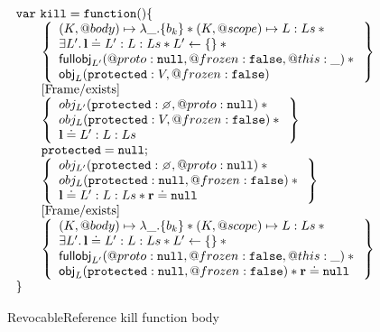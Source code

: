 \documentclass[a4paper]{article}
\begin{document}
\begin{figure}
\[
  \begin{array}{l}
    \jsvar{kill = function() \{} \\
    \indblock{
      \logic{
        (K, @body) \mapsto \lambda \_.\{b_k\} \sep (K, @scope) \mapsto L:Ls \sep {} \\
        \exists L' \st \ls \doteq L' : L : Ls \sep L' \bp \{\} \sep {} \\
        \fullobj_{L'}(@proto:\nil, @frozen:\false, @this:\_) \sep {} \\
        \obj_L(\js{protected}: V, @frozen: \false)
      } \\
      \step{Frame/exists} \\
      \logic{
        obj_{L'}(\js{protected}: \none, @proto: \nil) \sep {} \\
        obj_L(\js{protected}: V, @frozen: \false) \sep {} \\
        \ls \doteq L':L:Ls
      } \\
      \js{protected = null;} \\
      \logic{
        obj_{L'}(\js{protected}: \none, @proto: \nil) \sep {} \\
        obj_L(\js{protected}: \nil, @frozen: \false) \sep {} \\
        \ls \doteq L':L:Ls \sep \rv \doteq \nil
      } \\
      \step{Frame/exists} \\
      \logic{
        (K, @body) \mapsto \lambda \_.\{b_k\} \sep (K, @scope) \mapsto L:Ls \sep {} \\
        \exists L' \st \ls \doteq L' : L : Ls \sep L' \bp \{\} \sep {} \\
        \fullobj_{L'}(@proto:\nil, @frozen:\false, @this:\_) \sep {} \\
        \obj_L(\js{protected}: \nil, @frozen: \false) \sep \rv \doteq \nil
      }
    }
    \js{\}}
  \end{array}
\]
\caption{RevocableReference kill function body}
\label{rr-kill}
\end{figure}
\end{document}
